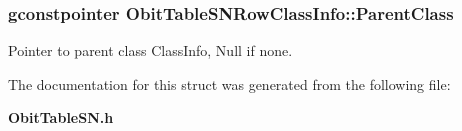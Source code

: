 \subsubsection{\setlength{\rightskip}{0pt plus 5cm}gconstpointer {\bf Obit\-Table\-SNRow\-Class\-Info::Parent\-Class}}\label{structObitTableSNRowClassInfo_o3}


Pointer to parent class Class\-Info, Null if none. 



The documentation for this struct was generated from the following file:\begin{CompactItemize}
\item 
{\bf Obit\-Table\-SN.h}\end{CompactItemize}
